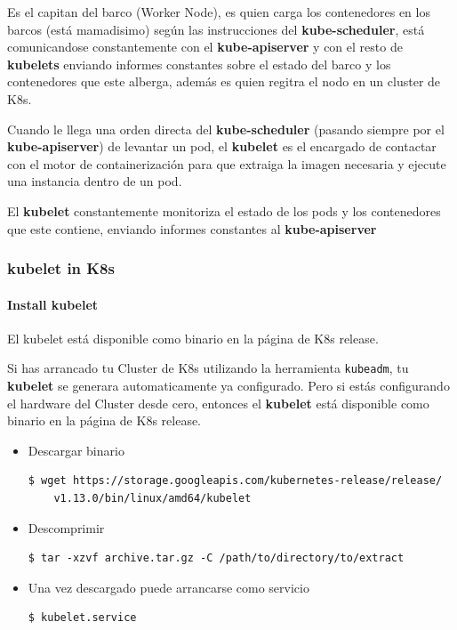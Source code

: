 \documentclass{article}
\newenvironment{codetemplate}[1][]{%
  \mybasecolorbox[#1]
  \itshape
}{%
  \endmybasecolorbox
}
\begin{document}
Es el capitan del barco (Worker Node), es quien carga los contenedores en los barcos (está mamadisimo) según las instrucciones del \textbf{kube-scheduler}, está comunicandose constantemente con el \textbf{kube-apiserver} y con el resto de \textbf{kubelets} enviando informes constantes sobre el estado del barco y los contenedores que este alberga, además es quien regitra el nodo en un cluster de K8s.

Cuando le llega una orden directa del \textbf{kube-scheduler} (pasando siempre por el \textbf{kube-apiserver}) de levantar un pod, el \textbf{kubelet} es el encargado de contactar con el motor de containerización para que extraiga la imagen necesaria y ejecute una instancia dentro de un pod.

El \textbf{kubelet} constantemente monitoriza el estado de los pods y los contenedores que este contiene, enviando informes constantes al \textbf{kube-apiserver}

\subsubsection{kubelet in K8s}

\paragraph{Install kubelet}

El kubelet está disponible como binario en la página de K8s release.

Si has arrancado tu Cluster de K8s utilizando la herramienta \verb|kubeadm|, tu \textbf{kubelet} se generara automaticamente ya configurado. Pero si estás configurando el hardware del Cluster desde cero, entonces el \textbf{kubelet} está disponible como binario en la página de K8s release.

\begin{itemize}
    \item Descargar binario
\begin{codetemplate}{}
\begin{verbatim}
$ wget https://storage.googleapis.com/kubernetes-release/release/
    v1.13.0/bin/linux/amd64/kubelet
\end{verbatim}
\end{codetemplate}

    \item Descomprimir
\begin{codetemplate}{}
\begin{verbatim}
$ tar -xzvf archive.tar.gz -C /path/to/directory/to/extract
\end{verbatim}
\end{codetemplate} 

    \item Una vez descargado puede arrancarse como servicio
\begin{codetemplate}{}
\begin{verbatim}
$ kubelet.service
\end{verbatim}
\end{codetemplate}
\end{itemize}
\end{document}

